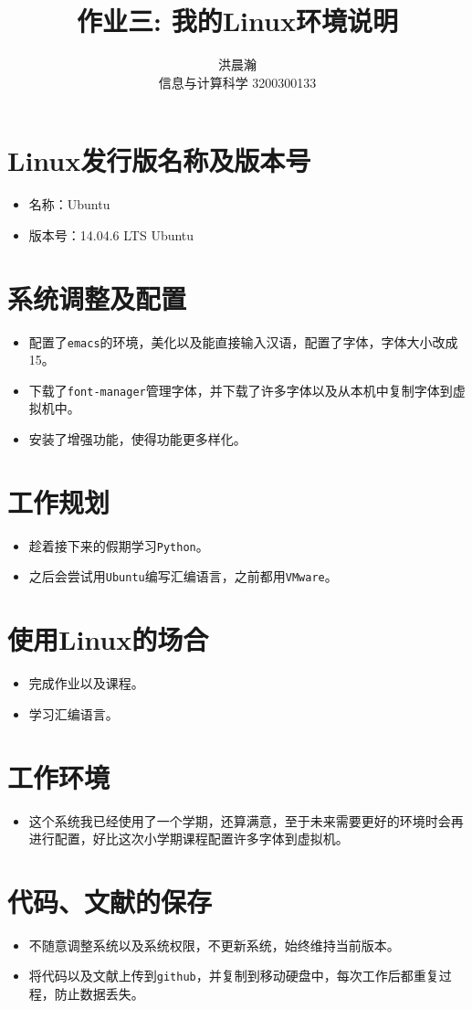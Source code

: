 \documentclass{ctexart}
\title{作业三: 我的Linux环境说明}
\author{洪晨瀚 \\ 信息与计算科学 3200300133}
\begin{document}
\maketitle

 
\section{Linux发行版名称及版本号}
\begin{itemize}
\item 名称：Ubuntu
\item 版本号：14.04.6 LTS Ubuntu
\end{itemize}

\section{系统调整及配置}
\begin{itemize}
\item 配置了\verb|emacs|的环境，美化以及能直接输入汉语，配置了字体，字体大小改成15。
\item 下载了\verb|font-manager|管理字体，并下载了许多字体以及从本机中复制字体到虚拟机中。
\item 安装了增强功能，使得功能更多样化。
\end{itemize}

\section{工作规划}
\begin{itemize}
\item 趁着接下来的假期学习\verb|Python|。
\item 之后会尝试用\verb|Ubuntu|编写汇编语言，之前都用\verb|VMware|。
\end{itemize}

\section{使用Linux的场合}
\begin{itemize}
\item 完成作业以及课程。
\item 学习汇编语言。
\end{itemize}

\section{工作环境}
\begin{itemize}
\item 这个系统我已经使用了一个学期，还算满意，至于未来需要更好的环境时会再进行配置，好比这次小学期课程配置许多字体到虚拟机。
\end{itemize}

\section{代码、文献的保存}
\begin{itemize}
\item 不随意调整系统以及系统权限，不更新系统，始终维持当前版本。\cite{de2010new}
\item 将代码以及文献上传到\verb|github|，并复制到移动硬盘中，每次工作后都重复过程，防止数据丢失。
\end{itemize}




\end{document}
